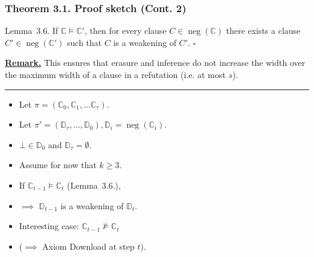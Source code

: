 \documentclass[t,usenames,dvipsnames]{beamer}
\newcommand {\nconf}{\operatorname{neg}}
\begin{document}
\begin{frame}\frametitle{Theorem 3.1. Proof sketch (Cont. 2)}
	\begin{block}{Lemma~3.6.}
		If $\mathbb{C} \models \mathbb{C}'$, then for every clause $C \in
		\nconf(\mathbb{C})$ there exists a clause $C' \in \nconf(\mathbb{C}')$ such that $C$
		is a weakening of $C'$. \hfill $\square$
	\end{block}
	\pause
	\textbf{\underline{Remark.}} This ensures that erasure and inference do not increase the
	width over the maximum width of a clause in a refutation (i.e. at most $s$).
	\pause
	\hrule
	\begin{itemize}[<+->]
		\item Let $\pi = (\mathbb{C}_0, \mathbb{C}_1, \dots \mathbb{C}_{\tau})$.
		\item Let $\pi' = (\mathbb{D}_{\tau}, \dots, \mathbb{D}_0), \mathbb{D}_i =
			\nconf(\mathbb{C}_i)$.
		\item $\bot \in \mathbb{D}_0$ and $\mathbb{D}_{\tau} = \emptyset$.
		\item {\color{red}Assume} for now that $k \geq 3$.
		\item If $\mathbb{C}_{t-1} \models \mathbb{C}_{t}$ (Lemma~3.6.),
		\item[] \hspace{.5cm} $\implies$  $\mathbb{D}_{t-1}$ is a weakening of
			$\mathbb{D}_t$.
		\item Interesting case: $\mathbb{C}_{t-1} \not \models \mathbb{C}_{t}$
		\item[] \hspace{.5cm} ($\implies$ Axiom Download at step $t$).
	\end{itemize}
\end{frame}
\end{document}
